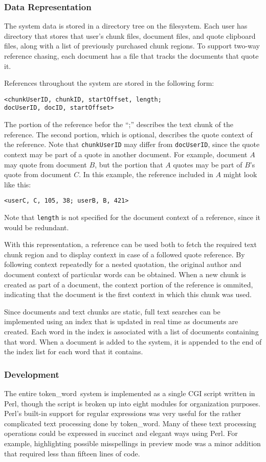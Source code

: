 \documentclass{acm_proc_article-sp}
\newcommand{\tw}{token\_word}
\begin{document}
\subsubsection{Data Representation}
The system data is stored in a directory tree on the filesystem.
Each user has directory that stores that user's chunk files, document files, and quote clipboard files, along with a list of previously purchased chunk regions.
To support two-way reference chasing, each document has a file that tracks the documents that quote it.

References throughout the system are stored in the following form:
\begin{center}
{\tt <chunkUserID, chunkID, startOffset, length;\\ 
docUserID, docID, startOffset>} 
\end{center}
The portion of the reference befor the ``;'' describes the text chunk of the reference.  
The second portion, which is optional, describes the quote context of the reference.  
Note that {\tt chunkUserID} may differ from {\tt docUserID}, since the quote context may be part of a quote in another document.
For example, document $A$ may quote from document $B$, but the portion that $A$ quotes may be part of $B$'s quote from document $C$.
In this example, the reference included in $A$ might look like this:
\begin{center}
{\tt <userC, C, 105, 38; userB, B, 421>} 
\end{center}
Note that {\tt length} is not specified for the document context of a reference, since it would be redundant.

With this representation, a reference can be used both to fetch the required text chunk region and to display context in case of a followed quote reference.
By following context repeatedly for a nested quotation, the original author and document context of particular words can be obtained.
When a new chunk is created as part of a document, the context portion of the reference is ommited, indicating that the document is the first context in which this chunk was used.

Since documents and text chunks are static, full text searches can be implemented using an index that is updated in real time as documents are created.
Each word in the index is associated with a list of documents containing that word.
When a document is added to the system, it is appended to the end of the index list for each word that it contains.


\subsubsection{Development}
The entire \tw \  system is implemented as a single CGI script written in Perl, though the script is broken up into eight modules for organization purposes.
Perl's built-in support for regular expressions was very useful for the rather complicated text processing done by \tw.
Many of these text processing operations could be expressed in succinct and elegant ways using Perl.
For example, highlighting possible misspellings in preview mode was a minor addition that required less than fifteen lines of code.
\end{document}
